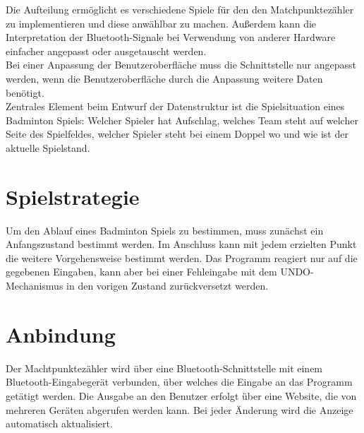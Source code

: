 Die Aufteilung ermöglicht es verschiedene Spiele für den den Matchpunktezähler zu implementieren und diese anwählbar zu machen. Außerdem kann die Interpretation der Bluetooth-Signale bei Verwendung von anderer Hardware einfacher angepasst oder ausgetauscht werden.\\
Bei einer Anpassung der Benutzeroberfläche muss die Schnittstelle nur angepasst werden, wenn die Benutzeroberfläche durch die Anpassung weitere Daten benötigt.\\[0.4cm]

Zentrales Element beim Entwurf der Datenstruktur ist die Spielsituation eines Badminton Spiels: Welcher Spieler hat Aufschlag, welches Team steht auf welcher Seite des Spielfeldes, welcher Spieler steht bei einem Doppel wo und wie ist der aktuelle Spielstand.
\section{Spielstrategie}
Um den Ablauf eines Badminton Spiels zu bestimmen, muss zunächst ein Anfangszustand bestimmt werden. Im Anschluss kann mit jedem erzielten Punkt die weitere Vorgehensweise bestimmt werden. Das Programm reagiert nur auf die gegebenen Eingaben, kann aber bei einer Fehleingabe mit dem UNDO-Mechanismus in den vorigen Zustand zurückversetzt werden.
\section{Anbindung}
Der Machtpunktezähler wird über eine Bluetooth-Schnittstelle mit einem Bluetooth-Eingabegerät verbunden, über welches die Eingabe an das Programm getätigt werden. Die Ausgabe an den Benutzer erfolgt über eine Website, die von mehreren Geräten abgerufen werden kann. Bei jeder Änderung wird die Anzeige automatisch aktualisiert.